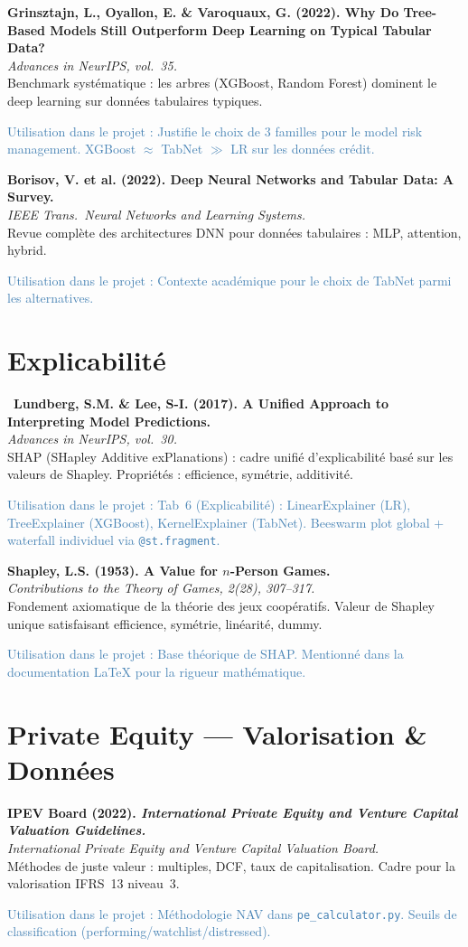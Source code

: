 \documentclass[12pt,a4paper]{article}
\newcommand{\bibentry}[4]{%
  \noindent\textbf{#1}\\
  \textit{#2}\\
  #3\par
  \textcolor{steelblue}{\footnotesize\textsf{Utilisation dans le projet :} #4}\par
  \medskip
}
\newcommand{\bibentrystar}[4]{%
  \noindent{\color{goldstar}$\bigstar$}~\textbf{#1}\\
  \textit{#2}\\
  #3\par
  \textcolor{steelblue}{\footnotesize\textsf{Utilisation dans le projet :} #4}\par
  \medskip
}
\begin{document}
\bibentry{Grinsztajn, L., Oyallon, E. \& Varoquaux, G. (2022). Why Do Tree-Based Models Still Outperform Deep Learning on Typical Tabular Data?}{\emph{Advances in NeurIPS}, vol.~35.}{Benchmark systématique : les arbres (XGBoost, Random Forest) dominent le deep learning sur données tabulaires typiques.}{Justifie le choix de 3 familles pour le model risk management. XGBoost $\approx$ TabNet $\gg$ LR sur les données crédit.}

\bibentry{Borisov, V. et al. (2022). Deep Neural Networks and Tabular Data: A Survey.}{\emph{IEEE Trans.\ Neural Networks and Learning Systems}.}{Revue complète des architectures DNN pour données tabulaires : MLP, attention, hybrid.}{Contexte académique pour le choix de TabNet parmi les alternatives.}

\section{Explicabilité}

\bibentrystar{Lundberg, S.M. \& Lee, S-I. (2017). A Unified Approach to Interpreting Model Predictions.}{\emph{Advances in NeurIPS}, vol.~30.}{SHAP (SHapley Additive exPlanations) : cadre unifié d'explicabilité basé sur les valeurs de Shapley. Propriétés : efficience, symétrie, additivité.}{Tab~6 (Explicabilité) : LinearExplainer (LR), TreeExplainer (XGBoost), KernelExplainer (TabNet). Beeswarm plot global + waterfall individuel via \texttt{@st.fragment}.}

\bibentry{Shapley, L.S. (1953). A Value for $n$-Person Games.}{\emph{Contributions to the Theory of Games}, 2(28), 307--317.}{Fondement axiomatique de la théorie des jeux coopératifs. Valeur de Shapley unique satisfaisant efficience, symétrie, linéarité, dummy.}{Base théorique de SHAP. Mentionné dans la documentation LaTeX pour la rigueur mathématique.}

\section{Private Equity --- Valorisation \& Données}

\bibentry{IPEV Board (2022). \emph{International Private Equity and Venture Capital Valuation Guidelines.}}{International Private Equity and Venture Capital Valuation Board.}{Méthodes de juste valeur : multiples, DCF, taux de capitalisation. Cadre pour la valorisation IFRS~13 niveau~3.}{Méthodologie NAV dans \texttt{pe\_calculator.py}. Seuils de classification (performing/watchlist/distressed).}
\end{document}
